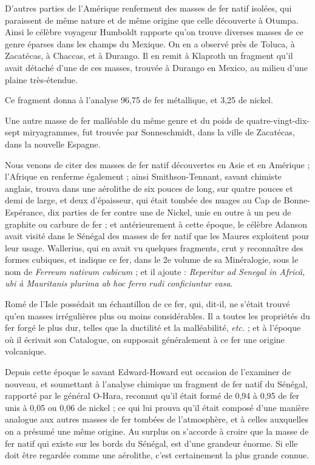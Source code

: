 \documentclass[a4paper, 12pt, oneside, french]{article}
\begin{document}
D'autres parties de l'Amérique renferment des masses de fer natif isolées, qui paraissent de même nature et de même origine que celle découverte à Otumpa. Ainsi le célèbre voyageur Humboldt rapporte qu'on trouve diverses masses de ce genre éparses dans les champs du Mexique. On en a observé près de Toluca, à Zacatécas, à Chaccas, et à Durango. Il en remit à Klaproth un fragment qu'il avait détaché d'une de ces masses, trouvée à Durango en Mexico, au milieu d'une plaine très-étendue.

Ce fragment donna à l'analyse 96,75 de fer métallique, et 3,25 de nickel.

Une autre masse de fer malléable du même genre et du poids de quatre-vingt-dix-sept miryagrammes, fut trouvée par Sonneschmidt, dans la ville de Zacatécas, dans la nouvelle Espagne.

Nous venons de citer des masses de fer natif découvertes en Asie et en Amérique ; l'Afrique en renferme également ; ainsi Smithson-Tennant, savant chimiste anglais, trouva dans une aérolithe de six pouces de long, sur quatre pouces et demi de large, et deux d'épaisseur, qui était tombée des nuages au Cap de Bonne-Espérance, dix parties de fer contre une de Nickel, unie en outre à un peu de graphite ou carbure de fer ; et antérieurement à cette époque, le célèbre Adanson avait visité dans le Sénégal des masses de fer natif que les Maures exploitent pour leur usage. Wallerius, qui en avait vu quelques fragments, crut y reconnaître des formes cubiques, et indique ce fer, dans le 2e volume de sa Minéralogie, sous le nom de \emph{Ferreum nativum cubicum} ; et il ajoute : \emph{Reperitur ad Senegal in Africâ, ubi à Mauritanis plurima ab hoc ferro rudi conficiuntur vasa}.

Romé de l'Isle possédait un échantillon de ce fer, qui, dit-il, ne s'était trouvé qu'en masses irrégulières plus ou moins considérables. Il a toutes les propriétés du fer forgé le plus dur, telles que la ductilité et la malléabilité, \emph{etc.} ; et à l'époque où il écrivait son Catalogue, on supposait généralement à ce fer une origine volcanique.

Depuis cette époque le savant Edward-Howard eut occasion de l'examiner de nouveau, et soumettant à l'analyse chimique un fragment de fer natif du Sénégal, rapporté par le général O-Hara, reconnut qu'il était formé de 0,94 à 0,95 de fer unis à 0,05 ou 0,06 de nickel ; ce qui lui prouva qu'il était composé d'une manière analogue aux autres masses de fer tombées de l'atmosphère, et à celles auxquelles on a présumé une même origine. Au surplus on s'accorde à croire que la masse de fer natif qui existe sur les bords du Sénégal, est d'une grandeur énorme. Si elle doit être regardée comme une aérolithe, c'est certainement la plus grande connue.
\end{document}
